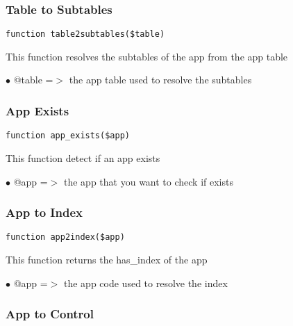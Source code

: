 \documentclass[a4paper]{article}
\begin{document}
\hypertarget{toc26}{}
\subsubsection{Table to Subtables}

\begin{lstlisting}
function table2subtables($table)
\end{lstlisting}

This function resolves the subtables of the app from the app table

\begin{compactitem}
\item[\color{myblue}$\bullet$] @table =$>$ the app table used to resolve the subtables
\end{compactitem}

\hypertarget{toc27}{}
\subsubsection{App Exists}

\begin{lstlisting}
function app_exists($app)
\end{lstlisting}

This function detect if an app exists

\begin{compactitem}
\item[\color{myblue}$\bullet$] @app =$>$ the app that you want to check if exists
\end{compactitem}

\hypertarget{toc28}{}
\subsubsection{App to Index}

\begin{lstlisting}
function app2index($app)
\end{lstlisting}

This function returns the has\_index of the app

\begin{compactitem}
\item[\color{myblue}$\bullet$] @app =$>$ the app code used to resolve the index
\end{compactitem}

\hypertarget{toc29}{}
\subsubsection{App to Control}
\end{document}
